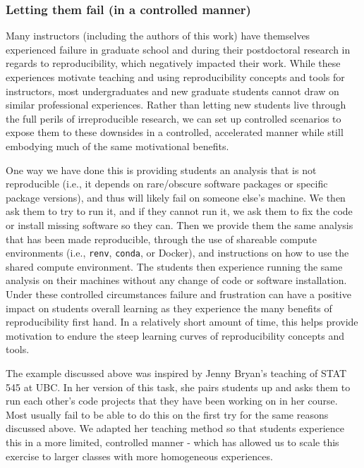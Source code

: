 \documentclass[
  12 pt,
]{paper}
\begin{document}
\hypertarget{letting-them-fail-in-a-controlled-manner}{%
\subsubsection{Letting them fail (in a controlled manner)}\label{letting-them-fail-in-a-controlled-manner}}

Many instructors (including the authors of this work)
have themselves experienced failure in graduate school
and during their postdoctoral research in regards to reproducibility,
which negatively impacted their work.
While these experiences motivate teaching and using
reproducibility concepts and tools for instructors,
most undergraduates and new graduate students cannot draw on similar professional experiences.
Rather than letting new students live through the full perils of irreproducible research,
we can set up controlled scenarios to expose them to these downsides
in a controlled, accelerated manner
while still embodying much of the same motivational benefits.

One way we have done this is providing students an analysis that is not
reproducible
(i.e., it depends on rare/obscure software packages
or specific package versions),
and thus will likely fail on someone else's machine.
We then ask them to try to run it,
and if they cannot run it, we ask them to fix the code
or install missing software so they can.
Then we provide them the same analysis that has been made reproducible,
through the use of shareable compute environments (i.e., \texttt{renv}, \texttt{conda}, or Docker),
and instructions on how to use the shared compute environment.
The students then experience running the same analysis on their machines
without any change of code or software installation.
Under these controlled circumstances
failure and frustration can have a positive impact on students overall learning
as they experience the many benefits of reproducibility first hand.
In a relatively short amount of time,
this helps provide motivation
to endure the steep learning curves of reproducibility concepts and tools.

The example discussed above was inspired by Jenny Bryan's teaching of STAT 545 at UBC.
In her version of this task, she pairs students up and asks them to
run each other's code projects that they have been working on in her course.
Most usually fail to be able to do this on the first try
for the same reasons discussed above.
We adapted her teaching method so that students experience this
in a more limited, controlled manner -
which has allowed us to scale this exercise to larger classes
with more homogeneous experiences.
\end{document}
